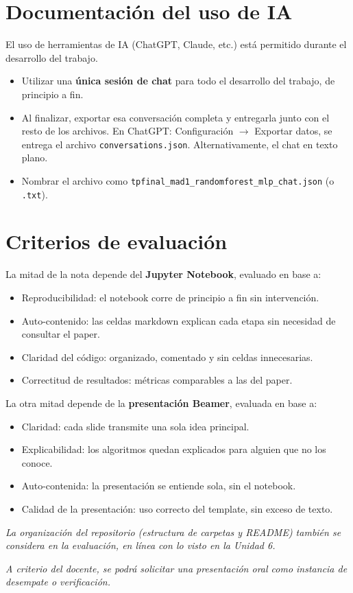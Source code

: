 \documentclass[11pt,a4paper]{article}
\newcommand{\codigo}[1]{\texttt{#1}}
\begin{document}
\section{Documentaci\'on del uso de IA}
El uso de herramientas de IA (ChatGPT, Claude, etc.) est\'a permitido durante el desarrollo del trabajo.
\begin{itemize}[leftmargin=2em,itemsep=2pt]
    \item Utilizar una \textbf{\'unica sesi\'on de chat} para todo el desarrollo del trabajo, de principio a fin.
    \item Al finalizar, exportar esa conversaci\'on completa y entregarla junto con el resto de los archivos. En ChatGPT: Configuraci\'on $\rightarrow$ Exportar datos, se entrega el archivo \codigo{conversations.json}. Alternativamente, el chat en texto plano.
    \item Nombrar el archivo como \codigo{tpfinal\_mad1\_randomforest\_mlp\_chat.json} (o \codigo{.txt}).
\end{itemize}

\section{Criterios de evaluaci\'on}
La mitad de la nota depende del \textbf{Jupyter Notebook}, evaluado en base a:
\begin{itemize}[leftmargin=2em,itemsep=2pt]
    \item Reproducibilidad: el notebook corre de principio a fin sin intervenci\'on.
    \item Auto-contenido: las celdas markdown explican cada etapa sin necesidad de consultar el paper.
    \item Claridad del c\'odigo: organizado, comentado y sin celdas innecesarias.
    \item Correctitud de resultados: m\'etricas comparables a las del paper.
\end{itemize}

La otra mitad depende de la \textbf{presentaci\'on Beamer}, evaluada en base a:
\begin{itemize}[leftmargin=2em,itemsep=2pt]
    \item Claridad: cada slide transmite una sola idea principal.
    \item Explicabilidad: los algoritmos quedan explicados para alguien que no los conoce.
    \item Auto-contenida: la presentaci\'on se entiende sola, sin el notebook.
    \item Calidad de la presentaci\'on: uso correcto del template, sin exceso de texto.
\end{itemize}

\textit{La organizaci\'on del repositorio (estructura de carpetas y README) tambi\'en se considera en la evaluaci\'on, en l\'inea con lo visto en la Unidad 6.}

\textit{A criterio del docente, se podr\'a solicitar una presentaci\'on oral como instancia de desempate o verificaci\'on.}
\end{document}
